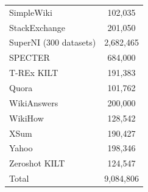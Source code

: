 \documentclass{article}
\begin{document}
\begin{table}[!htb]
\begin{minipage}{.5\linewidth}
\begin{tabular}{l|c}
SimpleWiki \cite{Coster2011SimpleEW} & 102,035  \\
StackExchange \cite{StackExchangeDataset} & 201,050 \\
SuperNI (300 datasets) \cite{wang2022supernaturalinstructions} & 2,682,465 \\
SPECTER \cite{cohan2020specter} & 684,000 \\
T-REx KILT \cite{ElSahar2018TRExAL,petroni2021kilt} & 191,383 \\
Quora \cite{quora-question-pairs} & 101,762 \\
WikiAnswers \cite{Fader2014OpenQA} & 200,000 \\
WikiHow \cite{koupaee2018wikihow} & 128,542 \\
XSum \cite{narayan2018dont} & 190,427 \\
Yahoo \cite{zhang2016characterlevel} & 198,346 \\
Zeroshot KILT \cite{levy2017zeroshot,petroni2021kilt} & 124,547 \\
\midrule
Total & 9,084,806 \\
\bottomrule
\end{tabular}
\end{minipage}
\label{tab:dcomp}
\end{table}

\end{document}
